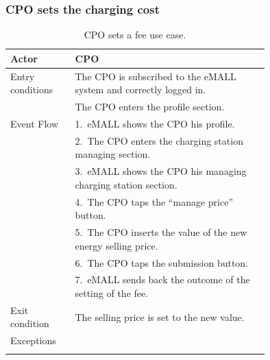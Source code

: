\subsubsection*{CPO sets the charging cost}
\begin{center}
    \begin{longtable}{lp{0.75\linewidth}}
        \hline
        Actor            & CPO                                                                \\
        \hline
        Entry conditions & The CPO is subscribed to the eMALL system and correctly logged in. \\
        & The CPO enters the profile section.                                \\
        \hline
        Event Flow       & 1.\ eMALL shows the CPO his profile.                               \\
        & 2.\ The CPO enters the charging station managing section.          \\
        & 3.\ eMALL shows the CPO his managing charging station section.     \\
        & 4.\ The CPO taps the ``manage price'' button.                      \\
        & 5.\ The CPO inserts the value of the new energy selling price.     \\
        & 6.\ The CPO taps the submission button.                            \\
        & 7.\ eMALL sends back the outcome of the setting of the fee.        \\
        \hline
        Exit condition   & The selling price is set to the new value.                         \\
        \hline
        Exceptions       &                                                                    \\
        \hline
        \caption{CPO sets a fee use case.}
        \label{tab: CPO_sets_fee_use_case}
    \end{longtable}
\end{center}

